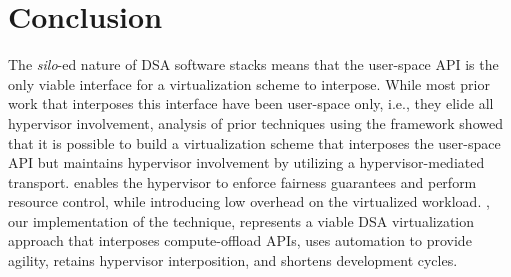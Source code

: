 
\section{Conclusion}
\label{sec:concluion}
The \emph{silo}-ed nature of DSA software stacks means that the user-space API
is the only viable interface for a virtualization scheme to interpose. While
most prior work that interposes this interface have been user-space only,
i.e., they elide all hypervisor involvement, analysis of prior techniques
using the \iemts framework showed that it is possible to build a
virtualization scheme that interposes the user-space API but maintains
hypervisor involvement by utilizing a hypervisor-mediated transport. \hirafull
enables the hypervisor to enforce fairness guarantees and perform resource
control, while introducing low overhead on the virtualized workload.
\AvA, our implementation of the \hira technique, represents a viable DSA
virtualization approach that interposes compute-offload APIs, uses automation
to provide agility, retains hypervisor interposition, and shortens development
cycles.